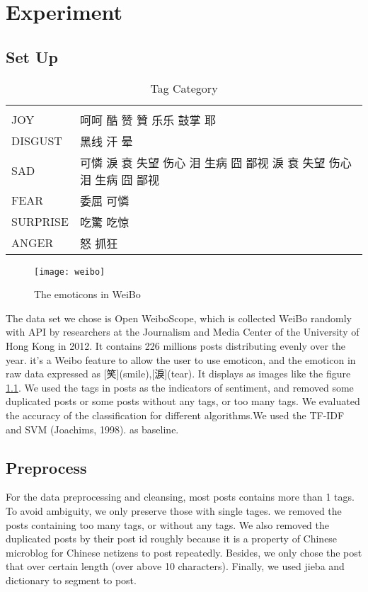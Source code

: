 \chapter{Experiment}

\section{Set Up}

\begin{table}[]
\centering
\caption{Tag Category}
\label{CategoryTable}
\begin{tabular}{ll}
      &  \\
JOY  & 呵呵 酷 赞 贊 乐乐 鼓掌 耶 \\
DISGUST & 黑线 汗 晕 \\
SAD &   可憐 淚 衰 失望 伤心 泪 生病 囧 鄙视  淚 衰 失望 伤心 泪 生病 囧 鄙视  \\
FEAR &  委屈  可憐 \\
SURPRISE &  吃驚 吃惊 \\
ANGER & 怒 抓狂
\end{tabular}
\end{table}

\begin{figure}[h]
    \centering
	\texttt{[image: weibo]}
    \caption{The emoticons in WeiBo}
    \label{fig:weibo}
\end{figure}

The data set we chose is Open WeiboScope\cite{fu2013reality}, which is collected WeiBo randomly with API by researchers at the Journalism and Media Center of the University of Hong Kong in 2012. 
It contains 226 millions posts distributing evenly over the year. 
it's a Weibo feature to allow the user to use emoticon, 
and the emoticon in raw data expressed as [笑](smile),[淚](tear). It displays as images like the figure \ref{fig:weibo}. 
We used the tags in posts as the indicators of sentiment, and removed some duplicated posts or some posts without any tags, or too many tags. 
We evaluated the accuracy of the classification for different algorithms.We used the TF-IDF and SVM (Joachims, 1998). as baseline.


\section{Preprocess}

For the data preprocessing and cleansing, most posts contains more than 1 tags. To avoid ambiguity, we only preserve those with single tages.
we removed the posts containing too many tags, or without any tags. We also removed the duplicated posts by their post id roughly because it is a property of Chinese microblog \cite{fu2013reality} for Chinese netizens to post repeatedly. 
Besides, we only chose the post that over certain length (over above 10 characters). Finally, we used jieba and dictionary to segment to post. \\

